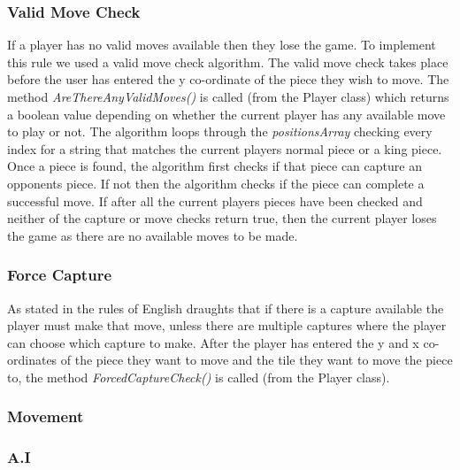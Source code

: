 \documentclass[10pt, a4paper]{article}
\begin{document}
    \subsubsection{Valid Move Check}
    If a player has no valid moves available then they lose the game. To implement this rule we used a valid move check algorithm.
    \newline
    The valid move check takes place before the user has entered the y co-ordinate of the piece they wish to move. The method \textit{AreThereAnyValidMoves()} is called (from the Player class) which returns a boolean value depending on whether the current player has any available move to play or not. 
    \newline
    The algorithm loops through the \textit{positionsArray} checking every index for a string that matches the current players normal piece or a king piece. 
    \newline
    Once a piece is found, the algorithm first checks if that piece can capture an opponents piece. 
    \newline
    If not then the algorithm checks if the piece can complete a successful move. 
    \newline
    If after all the current players pieces have been checked and neither of the capture or move checks return true, then the current player loses the game as there are no available moves to be made. 
    
    \subsubsection{Force Capture} 
    As stated in the rules of English draughts that if there is a capture available the player must make that move, unless there are multiple captures where the player can choose which capture to make.
    \newline
    After the player has entered the y and x co-ordinates of the piece they want to move and the tile they want to move the piece to, the method \textit{ForcedCaptureCheck()} is called (from the Player class).
    \newline
       
    
    \subsubsection{Movement}
     
    
    \subsubsection{A.I}
    
\end{document}
